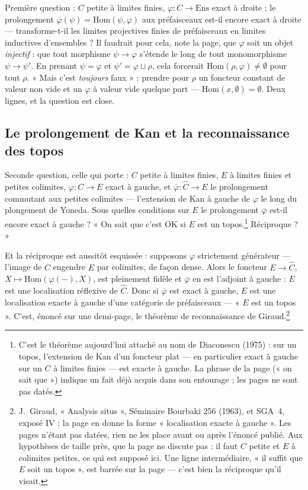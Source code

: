 \documentclass[11pt,a4paper]{article}
\begin{document}
Première question : $C$ petite à limites finies,
$\varphi : C \to \mathrm{Ens}$ exact à droite ; le prolongement
$\overline{\varphi}(\psi) = \mathrm{Hom}(\psi, \varphi)$ aux préfaisceaux
est-il encore exact à droite — transforme-t-il les limites projectives
finies de préfaisceaux en limites inductives d'ensembles ? Il faudrait pour
cela, note la page, que $\varphi$ soit un objet \emph{injectif} : que
tout morphisme $\psi \to \varphi$ s'étende le long de tout monomorphisme
$\psi \to \psi'$. En prenant $\psi = \varphi$ et
$\psi' = \varphi \sqcup \rho$, cela forcerait
$\mathrm{Hom}(\rho, \varphi) \neq \emptyset$ pour tout $\rho$. « Mais c'est
\emph{toujours} faux » : prendre pour $\rho$ un foncteur constant de valeur
non vide et un $\varphi$ à valeur vide quelque part —
$\mathrm{Hom}(x, \emptyset) = \emptyset$. Deux lignes, et la question est
close.

\subsection*{Le prolongement de Kan et la reconnaissance des topos}

Seconde question, celle qui porte : $C$ petite à limites finies, $E$ à
limites finies et petites colimites, $\varphi : C \to E$ exact à gauche,
et $\overline{\varphi} : \widehat{C} \to E$ le prolongement commutant aux
petites colimites — l'extension de Kan à gauche de $\varphi$ le long du
plongement de Yoneda. Sous quelles conditions sur $E$ le prolongement
$\overline{\varphi}$ est-il encore exact à gauche ? « On sait que c'est OK
si $E$ est un topos.\footnote{C'est le théorème aujourd'hui attaché au nom
de Diaconescu (1975) : sur un topos, l'extension de Kan d'un foncteur plat — en
particulier exact à gauche sur un $C$ à limites finies — est exacte à
gauche. La phrase de la page (« on sait que ») indique un fait déjà acquis
dans son entourage ; les pages ne sont pas datés.} Réciproque ? »

Et la réciproque est aussitôt esquissée : supposons $\varphi$ strictement
générateur — l'image de $C$ engendre $E$ par colimites, de façon dense.
Alors le foncteur $E \to \widehat{C}$, $X \mapsto \mathrm{Hom}(\varphi(-), X)$,
est pleinement fidèle et $\overline{\varphi}$ en est l'adjoint à gauche :
$E$ est une localisation réflexive de $\widehat{C}$. Donc si
$\overline{\varphi}$ est exact à gauche, $E$ est une localisation exacte à
gauche d'une catégorie de préfaisceaux — « $E$ est un topos ». C'est,
énoncé sur une demi-page, le théorème de reconnaissance de
Giraud.\footnote{J.~Giraud, « Analysis situs », Séminaire Bourbaki 256
(1963), et SGA~4, exposé IV ; la page en donne la forme « localisation exacte
à gauche ». Les pages n'étant pas datées, rien ne les place avant ou après
l'énoncé publié. Aux hypothèses de taille près, que la page ne discute
pas : il faut $C$ petite et $E$ à colimites petites, ce qui est supposé
ici. Une ligne intermédiaire, « il suffit que $E$ soit un topos », est
barrée sur la page — c'est bien la réciproque qu'il visait.}
\end{document}
